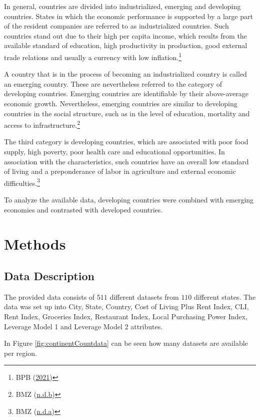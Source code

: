 \documentclass[
  11pt,
  a4paper,
  twoside]{scrbook}
\begin{document}
In general, countries are divided into industrialized, emerging and developing countries. States in which the economic performance is supported by a large part of the resident companies are referred to as industrialized countries. Such countries stand out due to their high per capita income, which results from the available standard of education, high productivity in production, good external trade relations and usually a currency with low inflation.\footnote{BPB (\protect\hyperlink{ref-bpd}{2021})}

A country that is in the process of becoming an industrialized country is called an emerging country. These are nevertheless referred to the category of developing countries. Emerging countries are identifiable by their above-average economic growth. Nevertheless, emerging countries are similar to developing countries in the social structure, such as in the level of education, mortality and access to infrastructure.\footnote{BMZ (\protect\hyperlink{ref-bmz}{n.d.b})}

The third category is developing countries, which are associated with poor food supply, high poverty, poor health care and educational opportunities. In association with the characteristics, such countries have an overall low standard of living and a preponderance of labor in agriculture and external economic difficulties.\footnote{BMZ (\protect\hyperlink{ref-bmzentwicklung}{n.d.a})}

To analyze the available data, developing countries were combined with emerging economies and contrasted with developed countries.

\hypertarget{methods}{%
\chapter{Methods}\label{methods}}

\hypertarget{data-description}{%
\section{Data Description}\label{data-description}}

The provided data consists of \(511\) different datasets from \(110\) different states. The data was set up into City, State, Country, Cost of Living Plus Rent Index, CLI, Rent Index, Groceries Index, Restaurant Index, Local Purchasing Power Index, Leverage Model 1 and Leverage Model 2 attributes.

In Figure \ref{fig:continentCountdata} can be seen how many datasets are available per region.
\end{document}
